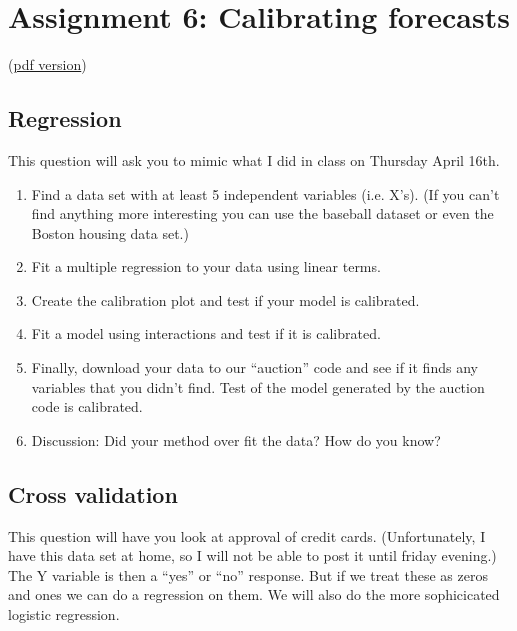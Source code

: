 \documentclass[12pt]{extarticle}
\begin{document}
\setcounter{section}{5}

\section{Assignment 6: Calibrating forecasts}

(\href{assignment6.pdf}{pdf version}) 

\subsection{Regression}
This question will ask you to mimic what I did in class on Thursday
April 16th.  
\begin{enumerate}
\item Find a data set with at least 5 independent variables
  (i.e. X's).  (If you can't find anything more interesting you can
  use the baseball dataset or even the Boston housing data set.)
\item Fit a multiple regression to your data using linear terms.
\item Create the calibration plot and test if your model is calibrated.
\item Fit a model using interactions and test if it is calibrated.
\item Finally, download your data to our ``auction'' code and see if
  it finds any variables that you didn't find.  Test of the model
  generated by the auction code is calibrated.
\item Discussion: Did your method over fit the data?  How do you know?
\end{enumerate}

\subsection{Cross validation}

This question will have you look at approval of credit cards.
(Unfortunately, I have this data set at home, so I will not be able to
post it until friday evening.)  The Y variable is then a ``yes'' or
``no'' response.  But if we treat these as zeros and ones we can do a
regression on them.  We will also do the more sophicicated logistic
regression.
\end{document}
